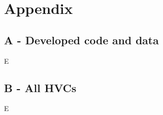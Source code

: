 \chapter{Appendix}
\label{cha:appendix}

\section{A - Developed code and data}
\label{sec:appendixA}

E

\section{B - All HVCs}
\label{sec:appendixB}

E